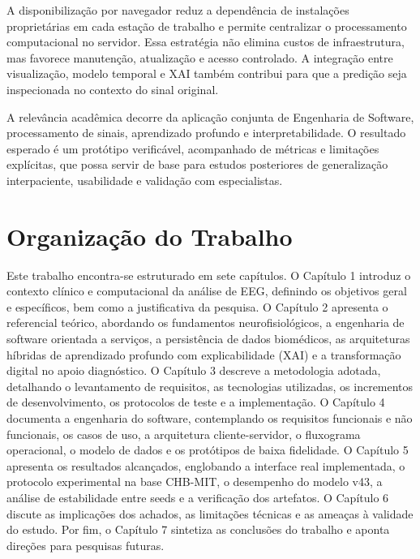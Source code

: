 A disponibilização por navegador reduz a dependência de instalações proprietárias em cada estação de trabalho e permite centralizar o processamento computacional no servidor. Essa estratégia não elimina custos de infraestrutura, mas favorece manutenção, atualização e acesso controlado. A integração entre visualização, modelo temporal e XAI também contribui para que a predição seja inspecionada no contexto do sinal original.

A relevância acadêmica decorre da aplicação conjunta de Engenharia de Software, processamento de sinais, aprendizado profundo e interpretabilidade. O resultado esperado é um protótipo verificável, acompanhado de métricas e limitações explícitas, que possa servir de base para estudos posteriores de generalização interpaciente, usabilidade e validação com especialistas.

\section{Organização do Trabalho}
Este trabalho encontra-se estruturado em sete capítulos. O Capítulo 1 introduz o contexto clínico e computacional da análise de EEG, definindo os objetivos geral e específicos, bem como a justificativa da pesquisa. O Capítulo 2 apresenta o referencial teórico, abordando os fundamentos neurofisiológicos, a engenharia de software orientada a serviços, a persistência de dados biomédicos, as arquiteturas híbridas de aprendizado profundo com explicabilidade (XAI) e a transformação digital no apoio diagnóstico. O Capítulo 3 descreve a metodologia adotada, detalhando o levantamento de requisitos, as tecnologias utilizadas, os incrementos de desenvolvimento, os protocolos de teste e a implementação. O Capítulo 4 documenta a engenharia do software, contemplando os requisitos funcionais e não funcionais, os casos de uso, a arquitetura cliente-servidor, o fluxograma operacional, o modelo de dados e os protótipos de baixa fidelidade. O Capítulo 5 apresenta os resultados alcançados, englobando a interface real implementada, o protocolo experimental na base CHB-MIT, o desempenho do modelo v43, a análise de estabilidade entre seeds e a verificação dos artefatos. O Capítulo 6 discute as implicações dos achados, as limitações técnicas e as ameaças à validade do estudo. Por fim, o Capítulo 7 sintetiza as conclusões do trabalho e aponta direções para pesquisas futuras.

